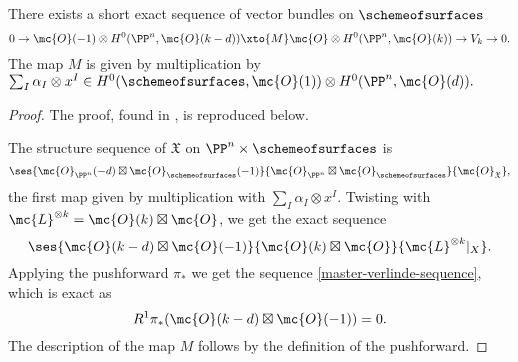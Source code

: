 \begin{proposition} \label{verlinde-exact-sequence}
	There exists a short exact sequence of vector bundles on $\schemeofsurfaces$ 
	\begin{equation} \label{master-verlinde-sequence}
	0\to  \mc{O}(-1) \otimes H^0(\PP^n, \mc{O}(k-d)) 
	\xto{M}  \mc{O} \otimes {H^0(\PP^n, \mc{O}(k))   }
	\to{V_k}
	\to 0.
	\end{equation}
	The map $M$ is given by multiplication by
	$\sum_I \alpha_I \otimes x^I \in
	H^0(\schemeofsurfaces,\mc{O}(1)) \otimes H^0(\PP^n,\mc{O}(d)).$
	\end{proposition}

\begin{proof}
	The proof, found in \cite[Proposition 4.2]{hemminghaus-verlinde-bundles}, is reproduced below.

	The structure sequence of $\mathfrak X$ on $\PP^n \times \schemeofsurfaces$ is
	\[
		\ses{\mc{O}_{\PP^n}(-d)\boxtimes \mc{O}_{\schemeofsurfaces}(-1)}
		{\mc{O}_{\PP^n}\boxtimes \mc{O}_{\schemeofsurfaces}}
		{\mc{O}_{\mathfrak X}},
	\]
	the first map given by multiplication with $\sum_I \alpha_I \otimes x^I$.
	Twisting with $\mc{L}^{\otimes k}=\mc{O}(k)\boxtimes \mc{O}$, we get the exact sequence
	\[
		\ses{\mc{O}(k-d)\boxtimes \mc{O}(-1)}
		{\mc{O}(k)\boxtimes \mc{O}}
		{\mc{L}^{\otimes k}|_X}.
	\]
	Applying the pushforward 
	$\pi_*$
	we get the sequence \cref{master-verlinde-sequence}, 
	which is exact as
	\[
		R^1 \pi_* (\mc{O}(k-d)\boxtimes \mc{O}(-1)) = 0.
	\]
	The description of the map $M$ follows by the definition of the pushforward.
\end{proof}